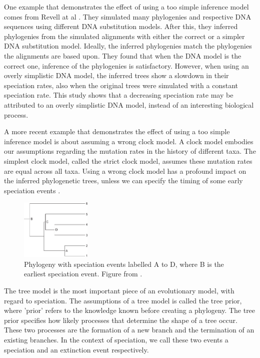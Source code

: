 One example that demonstrates the effect of using a too simple inference model
comes from Revell at al \cite{revell2005under}.
They simulated many phylogenies and respective DNA sequences 
using different DNA substitution models. 
After this, they inferred phylogenies from the simulated alignments
with either the correct or a simpler DNA substitution model. 
Ideally, the inferred phylogenies match the phylogenies the alignments are based upon.
They found that when the DNA model is the correct one, inference of the
phylogenies is satisfactory.
However, when using an overly simplistic DNA model, 
the inferred trees show a slowdown in their speciation rates, 
also when the original trees were simulated with a constant speciation rate.
This study shows that a decreasing speciation rate may be attributed
to an overly simplistic DNA model, instead of an interesting biological process.

%
%

A more recent example that demonstrates the effect of using a too simple 
inference model is about assuming a wrong clock model. 
A clock model embodies our assumptions regarding the mutation rates in
the history of different taxa. The simplest clock model, called the strict
clock model, assumes these mutation rates are equal across all taxa.
Using a wrong clock model has a profound impact 
on the inferred phylogenetic trees, unless we can
specify the timing of some early speciation events \cite{duchene2014impact}.

\begin{figure}[H]
  \includegraphics[width=0.3\textwidth]{duchene_et_al_2014_fig_1.png}
  \caption{
    Phylogeny with speciation events labelled A to D,
    where B is the earliest speciation event.
    Figure from \cite{duchene2014impact}.
 }
  \label{fig:duchene2014impact}
\end{figure}

The tree model is the most important piece of an evolutionary model,
with regard to speciation. The assumptions of a tree model is 
called the tree prior, where 'prior' refers to the knowledge
known before creating a phylogeny. The tree prior specifies how likely
processes that determine the shape of a tree occur. These
two processes are the formation of a new branch and the termination of
an existing branches. In the context of speciation, we call these
two events a speciation and an extinction event respectively.

